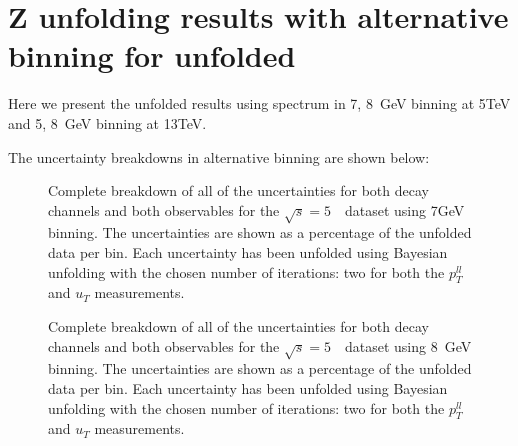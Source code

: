 \section{Z unfolding results with alternative binning for unfolded \ut}
\label{ss:Z_result_alterbin}

Here we present the unfolded \pt results using \ut spectrum in 7, 8~GeV binning at 5TeV and 5, 8~GeV binning at 13TeV.

The uncertainty breakdowns in alternative binning are shown below: 


\begin{figure}[h]
\centering

\caption{Complete breakdown of all of the uncertainties for both \Zboson decay channels and both observables for the $\sqrt{s} = 5$~\TeV\ dataset using 7GeV binning. The uncertainties are shown as a percentage of the unfolded data per \pT bin. Each uncertainty has been unfolded using Bayesian unfolding with the chosen number of iterations: two for both the $p_{T}^{ll}$ and $u_{T}$ measurements.}\end{figure}


\begin{figure}[h]
\centering

\caption{Complete breakdown of all of the uncertainties for both \Zboson decay channels and both observables for the $\sqrt{s} = 5$~\TeV\ dataset using 8~GeV binning. The uncertainties are shown as a percentage of the unfolded data per \pT bin. Each uncertainty has been unfolded using Bayesian unfolding with the chosen number of iterations: two for both the $p_{T}^{ll}$ and $u_{T}$ measurements.}\end{figure}

